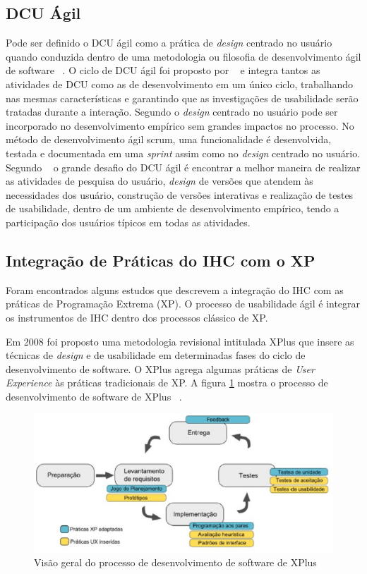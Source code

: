 \subsection{DCU Ágil}

Pode ser definido o DCU ágil como a prática de \emph{design} centrado no usuário quando conduzida dentro de uma metodologia ou filosofia de desenvolvimento ágil de software ~\cite{santos2012}. 
%
O ciclo de DCU ágil foi proposto por ~ e integra tantos as atividades de DCU como as de desenvolvimento em um único ciclo, trabalhando nas mesmas características e garantindo que as investigações de usabilidade serão tratadas durante a interação.
%
Segundo  o \emph{design} centrado no usuário pode ser incorporado no desenvolvimento empírico sem grandes impactos no processo. No método de desenvolvimento ágil scrum, uma funcionalidade é desenvolvida, testada e documentada em uma \textit{sprint} assim como no \emph{design} centrado no usuário. 
%	
Segundo ~ o grande desafio do DCU ágil é encontrar a melhor maneira de realizar as atividades de pesquisa do usuário, \emph{design} de versões que atendem às necessidades dos usuário, construção de versões interativas e realização de testes de usabilidade, dentro de um ambiente de desenvolvimento empírico, tendo a participação dos usuários típicos em todas as atividades.

\subsection{Integração de Práticas do IHC com o XP}

Foram encontrados alguns estudos que descrevem a integração do IHC com as práticas de Programação Extrema (XP). O processo de usabilidade ágil é integrar os instrumentos de IHC dentro dos processos clássico de XP. 

%
Em 2008 foi proposto uma metodologia revisional intitulada XPlus que insere as técnicas de \emph{design} e de usabilidade em determinadas fases do ciclo de desenvolvimento de software. O XPlus agrega algumas práticas de \textit{User Experience} às práticas tradicionais de XP. A figura \ref{ciclo_xplus} mostra o processo de desenvolvimento de software de XPlus ~\cite{guimaraesxplus}.

\begin{figure}[h]
    \centering
    \includegraphics[keepaspectratio=true,scale=0.60]
      {figuras/xplus.eps}
    \caption{Visão geral do processo de desenvolvimento de software de XPlus ~\cite{guimaraesxplus}}
    \label{ciclo_xplus}
\end{figure}


